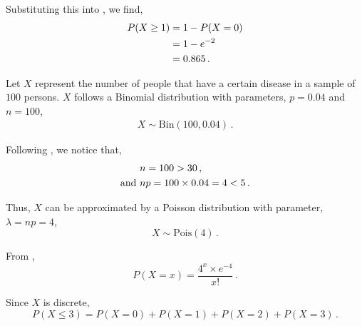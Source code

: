 \begin{subquestions}
Substituting this into , we find,
\begin{align}
	 P(X \geq 1) & = 1 - P(X=0) \nonumber \\
	             & = 1 - e^{-2} \nonumber \\
	             & = 0.865 \,.  
\end{align}


\subquestion 

Let $X$ represent the number of people that have a certain disease in a sample of $100$ persons. $X$ follows a Binomial distribution with parameters, $p=0.04$ and $n=100$,
\begin{align}
	X \sim\text{Bin}(100,0.04) \,.
\end{align}

Following , we notice that,
\begin{align}
	& n=100>30 \,, \nonumber \\
	\text{and} ~ & np=100 \times 0.04 = 4<5 \,. 
\end{align}

Thus, $X$ can be approximated by a Poisson distribution with parameter, $\lambda=np=4$,
\begin{equation}
	X \sim \text{Pois}(4) \,.
\end{equation}

From ,
\begin{equation}
	P(X = x) =\frac{4^x \times e^{-4}}{x!} \,. \label{2009:q4:PoisEqn3}
\end{equation}

Since $X$ is discrete,
\begin{equation}
	P(X \leq 3) = P(X=0)+P(X=1)+P(X=2)+P(X=3) \,. \label{2009:q4:Pois4}
\end{equation}


\end{subquestions}
